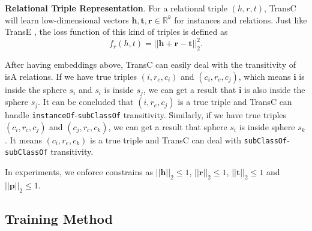\documentclass[11pt,a4paper]{article}
\begin{document}
  \textbf{Relational Triple Representation}. For a relational triple $(h, r, t)$, TransC will learn low-dimensional 
  vectors $\mathbf{h}, \mathbf{t}, \mathbf{r} \in \mathbb{R}^k$ for instances and relations. Just like TransE \cite{TransE},
  the loss function of this kind of triples is defined as
  \begin{equation}
    f_r(h, t) = ||\mathbf{h} + \mathbf{r} - \mathbf{t}||_2^2.
  \end{equation}
  
  After having embeddings above, TransC can easily deal with the transitivity of isA relations. If we have true triples $(i, r_e, c_i)$
  and $(c_i, r_c, c_j)$, which means $\mathbf{i}$ is inside the sphere $s_i$ and $s_i$ is inside $s_j$, we can get a result that
  $\mathbf{i}$ is also inside the sphere $s_j$. It can be concluded that $(i, r_e, c_j)$ is a true triple and TransC can handle
  \texttt{instanceOf}-\texttt{subClassOf} transitivity. Similarly, if we have true triples $(c_i, r_c, c_j)$ and $(c_j, r_c, c_k)$, we can get a
  result that sphere $s_i$ is inside sphere $s_k$. It means $(c_i, r_e, c_k)$ is a true triple and TransC can deal with
  \texttt{subClassOf}-\texttt{subClassOf} transitivity.
  
  In experiments, we enforce constrains as $||\mathbf{h}||_2 \le 1$, $||\mathbf{r}||_2 \le 1$, $||\mathbf{t}||_2 \le 1$ 
  and $||\mathbf{p}||_2 \le 1$.
  
  \subsection{Training Method}
  
\end{document}
